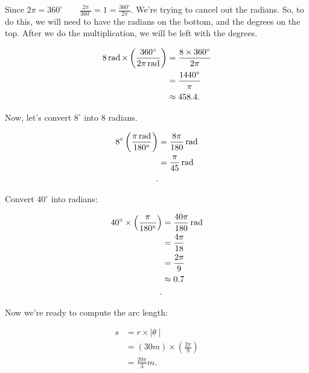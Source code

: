 \begin{solution}
	\label{sol:convert_8_radians_into_degrees_and_8_into_radians}

	Since $2\pi = 360^{\circ} \qquad \frac{2\pi}{360^{\circ}} = 1 = \frac{360^{\circ}}{2\pi}$.
	We're trying to cancel out the radians. So, to do this, we will need to have
	the radians on the bottom, and the degrees on the top. After we do the
	multiplication, we will be left with the degrees.

	\begin{align*}
		8\operatorname{rad} \times \left(\frac{360^{\circ}}{2\pi \operatorname{rad}}\right) & =
		\frac{8 \times 360^{\circ}}{2\pi}                                                    \\
		                                                        & = \frac{1440^{\circ}}{\pi} \\
		                                                        & \approx 458.4
		.\end{align*}

	Now, let's convert $8^{\circ}$ into $8$ radians.

	\begin{align*}
		8^{\circ} \left(\frac{\pi \operatorname{rad}}{180^{\circ}}\right) & =
		\frac{8\pi}{180} \operatorname{rad}                                                       \\
		                                                    & = \frac{\pi}{45} \operatorname{rad} \\
		.\end{align*}
\end{solution}

\begin{solution}
	\label{sol:what_is_the_arc_length_spanned_by_a_40_degree_angle_on_a_circle_of_radius_30_meters}

	Convert $40^{\circ}$ into radians:

	\begin{align*}
		40^{\circ} \times \left(\frac{\pi}{180^{\circ}}\right) & =
		\frac{40\pi}{180} \operatorname{rad}                                                     \\
		                                                       & = \frac{4\pi}{18} \\
		                                                       & = \frac{2\pi}{9}  \\
		                                                       & \approx 0.7       \\
		.\end{align*}

	Now we're ready to compute the arc length:

	\begin{align*}
		s & = r \times \mid \theta \mid     \\
		  & = (30m) \times (\frac{2\pi}{9}) \\
		  & = \frac{20\pi}{3}m
		.\end{align*}
\end{solution}

